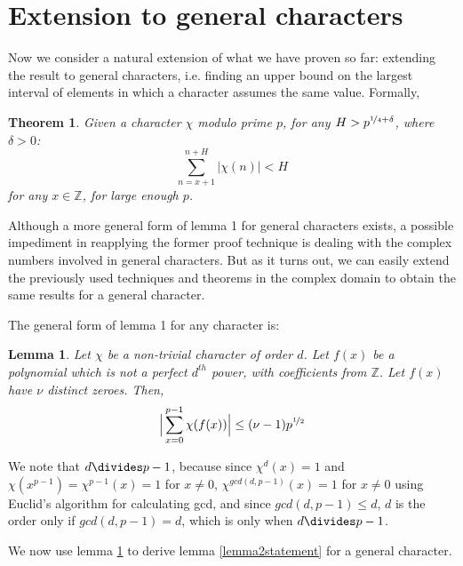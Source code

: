 \documentclass{report}
\newtheorem{lemma}{Lemma}
\newtheorem{theorem}{Theorem}
\begin{document}
\section{Extension to general characters}
%
%
Now we consider a natural extension of what we have proven so far: extending the result to general characters, i.e. finding an upper bound on the largest interval of elements in which a character assumes the same value. Formally,
\begin{theorem} \label{thm:genp4bound}
Given a character $\chi$ modulo prime $p$, for any $H>p^{\nicefrac{1}{4}+\delta}$, where $\delta>0$:
\[\sum\limits_{n=x+1}^{n+H}\lvert\chi(n)\rvert<H\]
for any $x\in\mathbb{Z}$, for large enough $p$.
\end{theorem}
Although a more general form of lemma 1 for general characters exists, a possible impediment in reapplying the former proof technique is dealing with the complex numbers involved in general characters. But as it turns out, we can easily extend the previously used techniques and theorems in the complex domain to obtain the same results for a general character.

The general form of lemma 1 for any character is:
\begin{lemma} \label{lemma4}
\textup{\cite{schmidt}}Let $\chi$ be a non-trivial character of order $d$. Let $f(x)$ be a polynomial which is not a perfect $d^{th}$ power, with coefficients from $\mathbb{Z}$. Let $f(x)$ have $\nu$ distinct zeroes. Then,
$$\Big\lvert\sum\limits_{x=0}^{p-1}\chi(f(x))\Big\rvert\leq (\nu -1)p^{\nicefrac{1}{2}}$$
\end{lemma}
We note that $d \divides p-1$, because since $\chi^{d}(x)=1$ and $\chi(x^{p-1})=\chi^{p-1}(x)=1$ for $x\neq0$, $\chi^{gcd(d,p-1)}(x)=1$ for $x\neq0$ using Euclid's algorithm for calculating gcd\footnotemark, and since $gcd(d,p-1)\leq d$, $d$ is the order only if $gcd(d,p-1) = d$, which is only when $d \divides p-1$.

We now use lemma \ref{lemma4} to derive lemma \ref{lemma2statement} for a general character.
\end{document}
